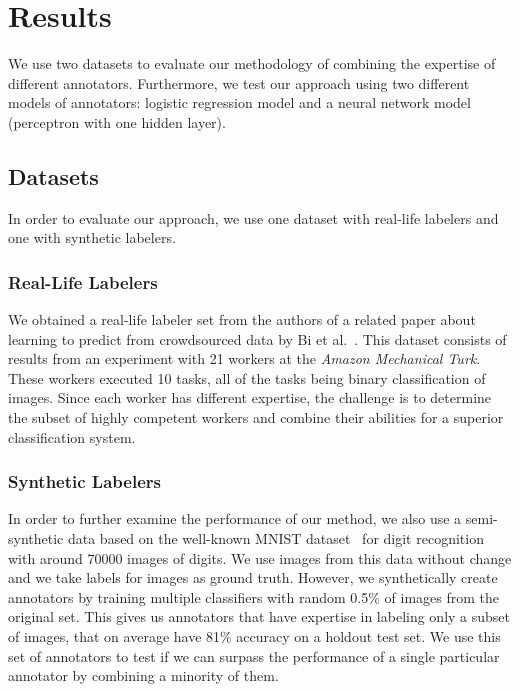 \documentclass{llncs}
\begin{document}
%
%

\section{Results}

We use two datasets to evaluate our methodology of combining the expertise of different annotators. Furthermore, we test our approach using two different models of annotators: logistic regression model and a neural network model (perceptron with one hidden layer).

\subsection{Datasets}
In order to evaluate our approach, we use one dataset with real-life labelers and one with synthetic labelers. 

\subsubsection{Real-Life Labelers}
We obtained a real-life labeler set from the authors of a related paper about learning to predict from crowdsourced data by Bi et al.~\cite{bi2014learning}. This dataset consists of results from an experiment with 21 workers at the \textit{Amazon Mechanical Turk}. These workers executed 10 tasks, all of the tasks being binary classification of images. Since each worker has different expertise, the challenge is to determine the subset of highly competent workers and combine their abilities for a superior classification system.

\subsubsection{Synthetic Labelers}
In order to further examine the performance of our method, we also use a semi-synthetic data based on the well-known MNIST dataset~\cite{lecun1998mnist} for digit recognition with around 70000 images of digits. We use images from this data without change and we take labels for images as ground truth. However, we synthetically create annotators by training multiple classifiers with random 0.5\% of images from the original set. This gives us annotators that have expertise in labeling only a subset of images, that on average have 81\% accuracy on a holdout test set. We use this set of annotators to test if we can surpass the performance of a single particular annotator by combining a minority of them.
\end{document}
